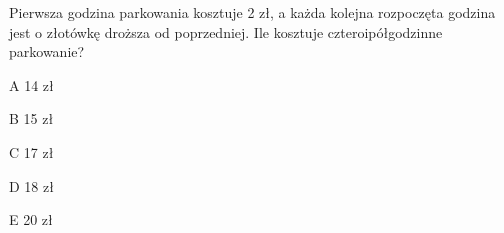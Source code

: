 \begin{tresc}
Pierwsza godzina parkowania kosztuje 2 zł, a każda kolejna rozpoczęta godzina jest o złotówkę droższa od poprzedniej. Ile kosztuje czteroipółgodzinne parkowanie?
\end{tresc}
\begin{wariant}{A} 14 zł \end{wariant}
\begin{wariant}{B} 15 zł \end{wariant}
\begin{wariant}{C} 17 zł \end{wariant}
\begin{wariant}{D} 18 zł \end{wariant}
\begin{wariant}{E} 20 zł \end{wariant}
